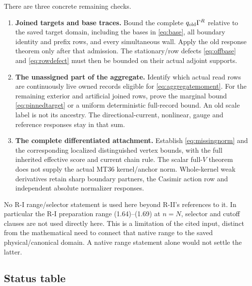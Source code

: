 \documentclass[11pt,letterpaper]{article}
\numberwithin{equation}{section}
\theoremstyle{plain}
\theoremstyle{remark}\newtheorem{remark}[theorem]{Scope}
\begin{document}
There are three concrete remaining checks.
\begin{enumerate}
\item \textbf{Joined targets and base traces.} Bound the complete
$q_{\rm old}\Gamma^R$ relative to the saved target domain, including
the bases in \eqref{eq:base}, all boundary identity and prefix rows,
and every simultaneous wall. Apply the old response theorem only
after that admission. The stationary/row defects
\eqref{eq:offbase} and \eqref{eq:rowdefect} must then be bounded on
their actual adjoint supports.
\item \textbf{The unassigned part of the aggregate.} Identify which
actual read rows are continuously live owned records eligible for
\eqref{eq:aggregatemoment}. For the remaining exterior and artificial
joined rows, prove the marginal bound \eqref{eq:pinnedtarget} or a
uniform deterministic full-record bound. An old scale label is not
its ancestry. The directional-current, nonlinear, gauge and reference
responses stay in that sum.
\item \textbf{The complete differentiated attachment.} Establish
\eqref{eq:missingnorm} and the corresponding localized distinguished
vertex bounds, with the full inherited effective score and current
chain rule. The scalar full-$V$ theorem does not supply the actual
MT36 kernel/anchor norm. Whole-kernel weak derivatives retain sharp
boundary partners, the Casimir action row and independent absolute
normalizer responses.
\end{enumerate}

No R-I range/selector statement is used here beyond
R-II's references to it. In particular the R-I preparation range
(1.64)--(1.69) at $n=N$, selector and cutoff clauses are not
used directly here. This is a limitation of the cited input, distinct
from the mathematical need to connect that native range to the saved
physical/canonical domain. A native range statement alone would not
settle the latter.

\subsection{Status table}
\end{document}
